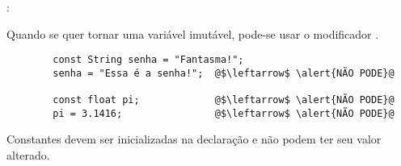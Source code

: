 \begin{frame}[fragile]{\insertsection: \insertsubsection}

	Quando se quer tornar uma variável imutável, pode-se usar o modificador \texttt{}.
	\begin{verbatim}
		const String senha = "Fantasma!";
		senha = "Essa é a senha!";  @$\leftarrow$ \alert{NÃO PODE}@

		const float pi;             @$\leftarrow$ \alert{NÃO PODE}@
		pi = 3.1416;                @$\leftarrow$ \alert{NÃO PODE}@
	\end{verbatim}

	Constantes devem ser inicializadas na declaração e não podem ter seu valor alterado.

\end{frame}


